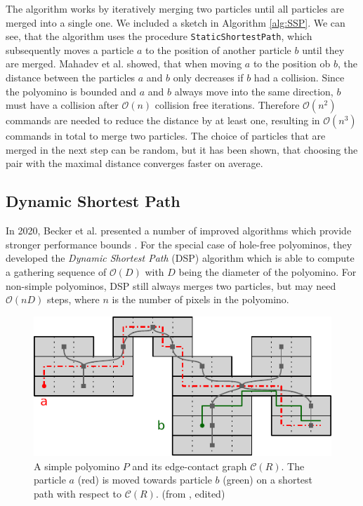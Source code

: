 The algorithm works by iteratively merging two particles until all particles are merged into a single one. We included a sketch in Algorithm \ref{alg:SSP}. We can see, that the algorithm uses the procedure \texttt{StaticShortestPath}, which subsequently moves a particle $a$ to the position of another particle $b$ until they are merged. Mahadev et al. showed, that when moving $a$ to the position ob $b$, the distance between the particles $a$ and $b$ only decreases if $b$ had a collision. Since the polyomino is bounded and $a$ and $b$ always move into the same direction, $b$ must have a collision after $\mathcal{O}(n)$ collision free iterations. Therefore $\mathcal{O}(n^2)$ commands are needed to reduce the distance by at least one, resulting in $\mathcal{O}(n^3)$ commands in total to merge two particles. The choice of particles that are merged in the next step can be random, but it has been shown, that choosing the pair with the maximal distance converges faster on average.

\subsection{Dynamic Shortest Path}
In 2020, Becker et al. presented a number of improved algorithms which provide stronger performance bounds \cite{becker2020}. For the special case of hole-free polyominos, they developed the \textit{Dynamic Shortest Path} (DSP) algorithm which is able to compute a gathering sequence of $\mathcal{O}(D)$ with $D$ being the diameter of the polyomino. For non-simple polyominos, DSP still always merges two particles, but may need $\mathcal{O}(nD)$ steps, where $n$ is the number of pixels in the polyomino. 

\begin{figure}[ht]
    
    \begin{center}
        \includegraphics[clip, width=0.6\columnwidth]{figures/drugdelivery/Gathering_Simple_b.pdf}
    \end{center}
    
    \caption[DSP and the Edge Contact Graph]{A simple polyomino $P$ and its edge-contact graph $\mathcal{C}(R)$. The particle $a$ (red) is moved towards particle $b$ (green) on a shortest path with respect to $\mathcal{C}(R)$. (from \cite{becker2020}, edited)}
    \label{fig:edge_contact_graph}
\end{figure}


